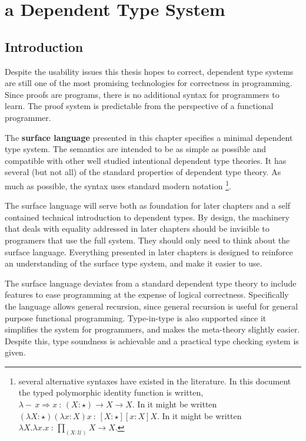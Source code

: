 \chapter{a Dependent Type System}
\label{chapter:Surface}
\thispagestyle{myheadings}

\section{Introduction}

Despite the usability issues this thesis hopes to correct, dependent type systems are still one of the most promising technologies for correctness in programming.
Since proofs are programs, there is no additional syntax for programmers to learn.
The proof system is predictable from the perspective of a functional programmer. 

The \textbf{surface language} presented in this chapter specifies a minimal dependent type system.
The semantics are intended to be as simple as possible and compatible with other well studied intentional dependent type theories.
It has several (but not all) of the standard properties of dependent type theory.
As much as possible, the syntax uses standard modern notation \footnote{several alternative syntaxes have existed in the literature.
In this document the typed polymorphic identity function is written, $\lambda-\,x\Rightarrow x\ :\,\left(X:\star\right)\rightarrow X\rightarrow X$.
In \cite{10.1016/0890-5401(88)90005-3} it might be written $\left(\lambda X:\star\right)\left(\lambda x:X\right)x\ :\,\left[X:\star\right]\left[x:X\right]X$.
In \cite{HoTTbook} it might be written $\lambda X.\lambda x.x\ :\,\underset{\left(X:\mathcal{U}\right)}{\prod}X\rightarrow X$.}.


The surface language will serve both as foundation for later chapters and a self contained technical introduction to dependent types.
By design, the machinery that deals with equality addressed in later chapters should be invisible to programers that use the full system.
They should only need to think about the surface language.
Everything presented in later chapters is designed to reinforce an understanding of the surface type system, and make it easier to use.


The surface language deviates from a standard dependent type theory to include features to ease programming at the expense of logical correctness.
Specifically the language allows general recursion, since general recursion is useful for general purpose functional programming.
Type-in-type is also supported since it simplifies the system for programmers, and makes the meta-theory slightly easier.
Despite this, type soundness is achievable and a practical type checking system is given.

